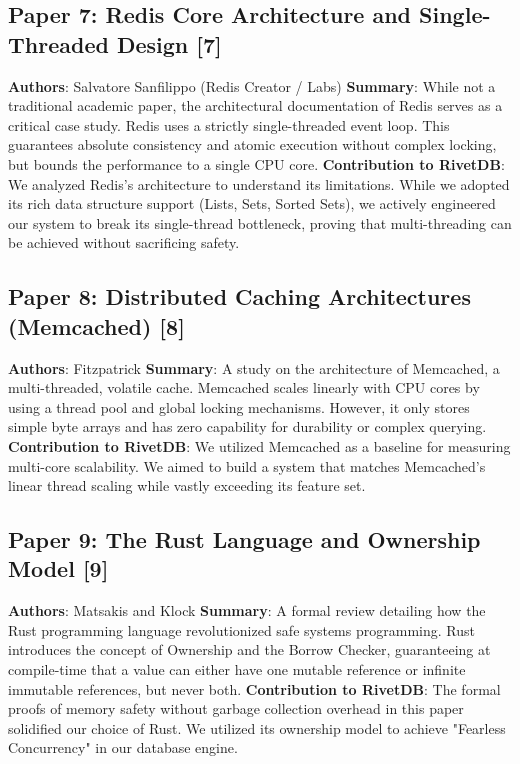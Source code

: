 \subsection{Paper 7: Redis Core Architecture and Single-Threaded Design [7]}
\textbf{Authors}: Salvatore Sanfilippo (Redis Creator / Labs)
\textbf{Summary}: While not a traditional academic paper, the architectural documentation of Redis serves as a critical case study. Redis uses a strictly single-threaded event loop. This guarantees absolute consistency and atomic execution without complex locking, but bounds the performance to a single CPU core.
\textbf{Contribution to RivetDB}: We analyzed Redis's architecture to understand its limitations. While we adopted its rich data structure support (Lists, Sets, Sorted Sets), we actively engineered our system to break its single-thread bottleneck, proving that multi-threading can be achieved without sacrificing safety.

\subsection{Paper 8: Distributed Caching Architectures (Memcached) [8]}
\textbf{Authors}: Fitzpatrick
\textbf{Summary}: A study on the architecture of Memcached, a multi-threaded, volatile cache. Memcached scales linearly with CPU cores by using a thread pool and global locking mechanisms. However, it only stores simple byte arrays and has zero capability for durability or complex querying.
\textbf{Contribution to RivetDB}: We utilized Memcached as a baseline for measuring multi-core scalability. We aimed to build a system that matches Memcached's linear thread scaling while vastly exceeding its feature set.

\subsection{Paper 9: The Rust Language and Ownership Model [9]}
\textbf{Authors}: Matsakis and Klock
\textbf{Summary}: A formal review detailing how the Rust programming language revolutionized safe systems programming. Rust introduces the concept of Ownership and the Borrow Checker, guaranteeing at compile-time that a value can either have one mutable reference or infinite immutable references, but never both.
\textbf{Contribution to RivetDB}: The formal proofs of memory safety without garbage collection overhead in this paper solidified our choice of Rust. We utilized its ownership model to achieve "Fearless Concurrency" in our database engine.

